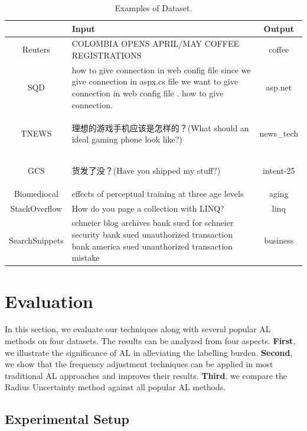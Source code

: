 \begin{table}[th]
\scriptsize
\centering
\begin{tabular}{c P{4cm} c}
\hline
& Input     &      Output          \\ \hline
Reuters     & COLOMBIA OPENS APRIL/MAY COFFEE REGISTRATIONS & coffee         \\ \hline
SQD &  how to give connection in web config file   since we give connection in aspx.cs file we want to give connection in web config file . how to give connection. & asp.net \\ \hline
TNEWS & \begin{CJK}{UTF8}{gbsn}理想的游戏手机应该是怎样的？(What should an ideal gaming phone look like?)\end{CJK} & news\_tech \\ \hline
GCS     & \begin{CJK}{UTF8}{gbsn}货发了没？(Have you shipped my stuff?)\end{CJK} & intent-25          \\ \hline
Biomediocal & effects of perceptual training at three age levels & aging \\ \hline
StackOverflow & How do you page a collection with LINQ? & linq\\ \hline
SearchSnippets & schneier blog archives bank sued for schneier security bank sued unauthorized transaction bank america sued unauthorized transaction mistake & business\\ \hline
\end{tabular}
\caption{Examples of Dataset.}
\label{table:exampleOfDataset}
\end{table}


\section{Evaluation}
\label{sec:eval}

In this section, we evaluate our techniques along with
several popular AL methods on four datasets. 
The results can be analyzed from four aspects. \textbf{First},  we illustrate the significance of AL in alleviating the labelling burden. \textbf{Second}, we show that the frequency adjustment techniques can be applied in most traditional AL approaches and improves their results. \textbf{Third}, we compare the Radius Uncertainty method against all popular AL methods. 

\subsection{Experimental Setup}
